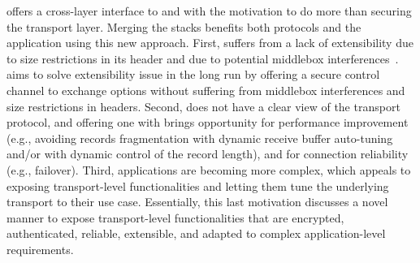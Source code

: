 

\tcpls offers a cross-layer interface to \tls and \tcp with the motivation to do more than securing the transport layer. Merging the stacks benefits both protocols and the application using this new approach. First, \tcp suffers from a lack of extensibility due to size restrictions in its header and due to
potential middlebox interferences~\cite{honda2011still}. \tcpls aims to solve
\tcp extensibility issue in the long run by offering a secure control channel
to exchange \tcp options without suffering from middlebox interferences
and size restrictions in \tcp headers. Second, \tls does not have a clear view of the transport protocol, and offering one with \tcpls brings opportunity for performance improvement (e.g., avoiding records fragmentation with dynamic receive buffer auto-tuning and/or with dynamic control of the record length), and for connection reliability (e.g., failover).  Third, applications are becoming more complex, which appeals to exposing transport-level functionalities and letting them tune the underlying transport to their use case. Essentially, this last motivation discusses a novel manner to expose
transport-level functionalities that are encrypted, authenticated, reliable,
extensible, and adapted to complex application-level requirements.


